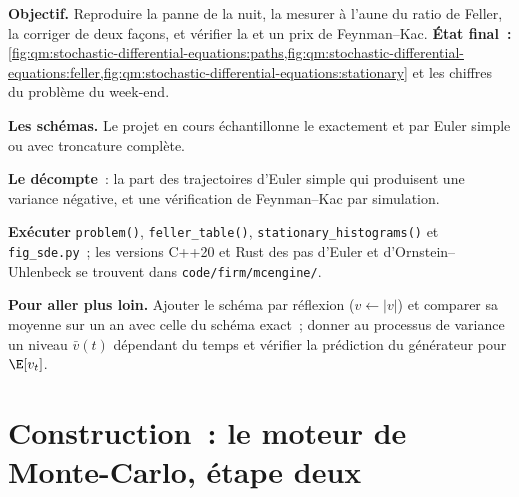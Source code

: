 \begin{tutorial}
\textbf{Objectif.} Reproduire la panne de la nuit, la mesurer à l'aune du ratio de Feller, la corriger de deux
façons, et vérifier la  et un prix de Feynman--Kac. \textbf{État final~:}
\cref{fig:qm:stochastic-differential-equations:paths,fig:qm:stochastic-differential-equations:feller,fig:qm:stochastic-differential-equations:stationary}
et les chiffres du problème du week-end.
\begin{tutsteps}
\item \textbf{Les schémas.} Le projet en cours échantillonne le  exactement et par
Euler simple ou avec troncature complète.
\label{lst:qm:stochastic-differential-equations:sqrt}
\item \textbf{Le décompte}~: la part des trajectoires d'Euler simple qui produisent une variance négative, et une
vérification de Feynman--Kac par simulation.
\label{lst:qm:stochastic-differential-equations:fk}
\item \textbf{Exécuter} \texttt{problem()}, \texttt{feller\_table()}, \texttt{stationary\_histograms()} et
\texttt{fig\_sde.py}~; les versions C++20 et Rust des pas d'Euler et d'Ornstein--Uhlenbeck se trouvent dans
\texttt{code/firm/mcengine/}.
\end{tutsteps}
\textbf{Pour aller plus loin.} Ajouter le schéma par réflexion ($v \leftarrow |v|$) et comparer sa moyenne sur un an
avec celle du schéma exact~; donner au processus de variance un niveau $\bar v(t)$ dépendant du temps et
vérifier la prédiction du générateur pour $\E[v_t]$.
\end{tutorial}

\section{Construction~: le moteur de Monte-Carlo, étape deux}\label{bld:qm:stochastic-differential-equations:mcengine}

